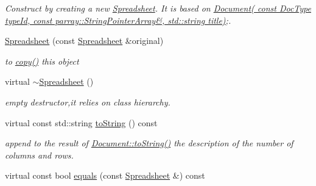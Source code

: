 \begin{DoxyCompactItemize}
\begin{DoxyCompactList}\small\item\em Construct by creating a new \hyperlink{classdocs_1_1Spreadsheet}{Spreadsheet}. It is based on \hyperlink{classdocs_1_1Document_a4a76d0cee2709582e4b9f3b5b8db0277}{Document( const Doc\-Type type\-Id, const parray\-::\-String\-Pointer\-Array\&, std\-::string title)};. \end{DoxyCompactList}\item 
\hypertarget{classdocs_1_1Spreadsheet_a7bbb06aa9261596202f71c65c5400ff2}{\hyperlink{classdocs_1_1Spreadsheet_a7bbb06aa9261596202f71c65c5400ff2}{Spreadsheet} (const \hyperlink{classdocs_1_1Spreadsheet}{Spreadsheet} \&original)}\label{classdocs_1_1Spreadsheet_a7bbb06aa9261596202f71c65c5400ff2}

\begin{DoxyCompactList}\small\item\em to \hyperlink{classdocs_1_1Spreadsheet_ad7ab608a90b53969ec97214c447c43c6}{copy()} this object \end{DoxyCompactList}\item 
\hypertarget{classdocs_1_1Spreadsheet_a5291016cd2e874e6ce3cf457723fc98c}{virtual \hyperlink{classdocs_1_1Spreadsheet_a5291016cd2e874e6ce3cf457723fc98c}{$\sim$\-Spreadsheet} ()}\label{classdocs_1_1Spreadsheet_a5291016cd2e874e6ce3cf457723fc98c}

\begin{DoxyCompactList}\small\item\em empty destructor,it relies on class hierarchy. \end{DoxyCompactList}\item 
\hypertarget{classdocs_1_1Spreadsheet_ab288d28a2f204e28f0c5d7a097f43bfa}{virtual const std\-::string \hyperlink{classdocs_1_1Spreadsheet_ab288d28a2f204e28f0c5d7a097f43bfa}{to\-String} () const }\label{classdocs_1_1Spreadsheet_ab288d28a2f204e28f0c5d7a097f43bfa}

\begin{DoxyCompactList}\small\item\em append to the result of \hyperlink{classdocs_1_1Document_a16db383045038b779eb489ad125ef02b}{Document\-::to\-String()} the description of the number of columns and rows. \end{DoxyCompactList}\item 
\hypertarget{classdocs_1_1Spreadsheet_a4272d9ebb0edce7d6e3946ca6d08c59b}{virtual const bool \hyperlink{classdocs_1_1Spreadsheet_a4272d9ebb0edce7d6e3946ca6d08c59b}{equals} (const \hyperlink{classdocs_1_1Spreadsheet}{Spreadsheet} \&) const }\label{classdocs_1_1Spreadsheet_a4272d9ebb0edce7d6e3946ca6d08c59b}


\end{DoxyCompactItemize}
